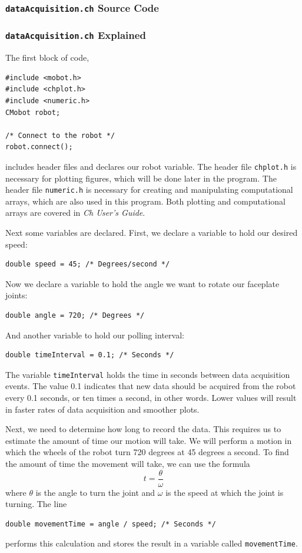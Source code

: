 \documentclass{article}
\begin{document}
\subsubsection{\texttt{dataAcquisition.ch} Source Code}


\subsubsection{\texttt{dataAcquisition.ch} Explained}
The first block of code,
\begin{verbatim}
#include <mobot.h>
#include <chplot.h>
#include <numeric.h>
CMobot robot;

/* Connect to the robot */
robot.connect();
\end{verbatim}
includes header files and declares our robot variable. The header file
\texttt{chplot.h} is necessary for plotting figures, which will be done later in the
program. The header file \texttt{numeric.h} is necessary for creating and manipulating
computational arrays, which are also used in this program. Both plotting and computational
arrays are covered in {\it Ch User's Guide}.

Next some variables are declared. First, we declare a variable to hold our
desired speed:
\begin{verbatim}
double speed = 45; /* Degrees/second */
\end{verbatim}
Now we declare a variable to hold the angle we want to rotate our faceplate joints:
\begin{verbatim}
double angle = 720; /* Degrees */
\end{verbatim}
And another variable to hold our polling interval:
\begin{verbatim}
double timeInterval = 0.1; /* Seconds */
\end{verbatim}
The variable \texttt{timeInterval} holds the time in seconds between data acquisition
events. The value 0.1 indicates that new data should be acquired from the robot
every 0.1 seconds, or ten times a second, in other words. Lower values will result in faster
rates of data acquisition and smoother plots. 

Next, we need to determine how long to record the data. This requires us to estimate the 
amount of time our motion will take. We will perform a motion in which the wheels of the
robot turn 720 degrees at 45 degrees a second. To find the amount of time the movement 
will take, we can use the formula
\begin{equation*}
t = \frac{\theta}{\omega}
\end{equation*}
where $\theta$ is the angle to turn the joint and $\omega$ is the speed at which the
joint is turning. The line
\begin{verbatim}
double movementTime = angle / speed; /* Seconds */
\end{verbatim}
performs this calculation and stores the result in a variable called \texttt{movementTime}.
\end{document}
